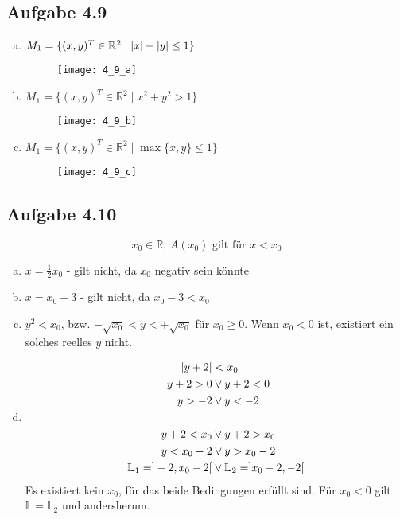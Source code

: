 \documentclass{standalone}
\begin{document}
 

\subsection{Aufgabe 4.9}

\begin{enumerate}[a)]
    \item $M_1 = \{ (x,y)^T \in \mathbb{R}^2 \mid \lvert x\rvert + \lvert y\rvert \leq 1 \}$
    \begin{figure}[htbp]
        \centering
        \texttt{[image: 4\_9\_a]}
    \end{figure}
    \FloatBarrier

    \item $M_1 = \{ (x,y)^T \in \mathbb{R}^2 \mid x^2 + y^2 > 1 \}$
    \begin{figure}[htbp]
        \centering
        \texttt{[image: 4\_9\_b]}
    \end{figure}
    \FloatBarrier
    
    \item $M_1 = \{ (x,y)^T \in \mathbb{R}^2 \mid \max\{x,y\} \leq 1 \}$
    \begin{figure}[htbp]
        \centering
        \texttt{[image: 4\_9\_c]}
    \end{figure}
    \FloatBarrier
\end{enumerate}

\subsection{Aufgabe 4.10}
$$x_0 \in \mathbb{R} \text{, } A(x_0) \text{ gilt für } x < x_0$$
\begin{enumerate}[a)]
    \item $x =\frac{1}{2}x_0$ - gilt nicht, da $x_0$ negativ sein könnte
    \item $x =x_0 - 3$ - gilt nicht, da $x_0 - 3 < x_0$
    \item $y^2 < x_0$, bzw. $-\sqrt{x_0} < y < +\sqrt{x_0}$ für $x_0 \geq 0$. Wenn $x_0 < 0$ ist, existiert ein solches reelles $y$ nicht.
    \item \begin{align}
        \lvert y+2\rvert &< x_0 \\
        y+2 > 0 &\vee y+2 < 0 \\
        y > -2 &\vee y < -2 \\
        \\
        y+2 < x_0 &\vee y+2 > x_0 \\
        y < x_0 -2 &\vee y > x_0 -2 \\
        \mathbb{L}_1 = ]-2,x_0 -2[ &\vee \mathbb{L}_2 = ]x_0-2, -2[
    \end{align}
    Es existiert kein $x_0$, für das beide Bedingungen erfüllt sind.
    Für $x_0 < 0$ gilt $\mathbb{L} = \mathbb{L}_2$ und andersherum.
\end{enumerate}
\end{document}
